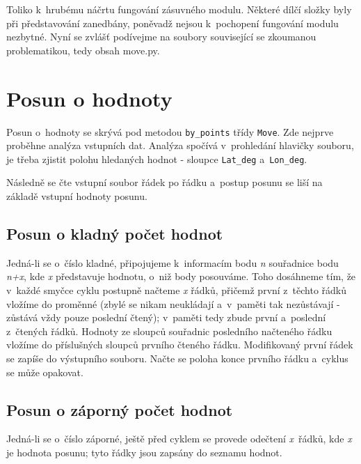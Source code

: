 Toliko k~hrubému náčrtu fungování zásuvného modulu. Některé dílčí složky byly při představování
zane\-dbány, poněvadž nejsou k~pochopení fungování mo\-dulu nezbytné. Nyní se zvlášť podívejme na
soubory související se zkoumanou pro\-blematikou, tedy obsah move.py. 


\section{Posun o hodnoty}
\label{by_points}

Posun o~hodnoty se skrývá pod metodou {\tt by\_points} třídy {\tt Move}.
Zde nejprve proběhne analýza vstupních dat.
Analýza spočívá v~prohledání hlavičky souboru, je třeba zjistit polohu hledaných hodnot - sloupce
{\tt Lat\_deg} a~{\tt Lon\_deg}. 

Následně se čte vstupní soubor řádek po řádku a~postup posunu se liší na základě vstupní hodnoty posunu. 

\subsection{Posun o kladný počet hodnot}
\label{kladnehodnoty}

Jedná-li se o~číslo kladné, připojujeme k~informacím bodu \textit{n} souřadnice bodu
\textit{n+x}, kde \textit{x} představuje hodnotu, o~niž body posouváme. Toho dosáhneme tím, že
v~každé smyčce cyklu postupně načteme \textit{x} řádků, přičemž první z~těchto řádků vložíme do proměnné
(zbylé se nikam neukládají a~v~paměti tak nezůstávají - zůstává vždy pouze poslední čtený);
v~paměti tedy zbude první a~poslední z~čtených řádků. Hodnoty ze sloupců souřadnic posledního
načteného řádku vložíme do příslušných sloupců prvního čteného řádku. Modifikovaný první
řádek se zapíše do výstupního souboru. Načte se poloha konce prvního řádku a~cyklus se může opakovat. 

\subsection{Posun o záporný počet hodnot}
\label{zapornehodnoty}

Jedná-li se o~číslo záporné, ještě před cyklem se provede odečtení \textit{x}~řádků,
kde \textit{x} je hodnota posunu; tyto řádky jsou zapsány do seznamu hodnot.

